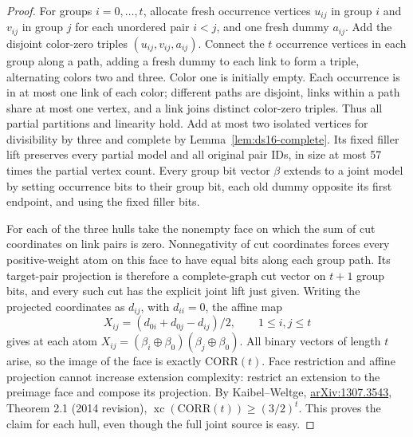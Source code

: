 \documentclass[11pt]{article}
\begin{document}
\begin{proof}
For groups $i=0,\ldots,t$, allocate fresh occurrence vertices $u_{ij}$ in group $i$ and $v_{ij}$ in group $j$ for each unordered pair $i<j$, and one fresh dummy $a_{ij}$. Add the disjoint color-zero triples $(u_{ij},v_{ij},a_{ij})$. Connect the $t$ occurrence vertices in each group along a path, adding a fresh dummy to each link to form a triple, alternating colors two and three. Color one is initially empty. Each occurrence is in at most one link of each color; different paths are disjoint, links within a path share at most one vertex, and a link joins distinct color-zero triples. Thus all partial partitions and linearity hold. Add at most two isolated vertices for divisibility by three and complete by Lemma~\ref{lem:ds16-complete}. Its fixed filler lift preserves every partial model and all original pair IDs, in size at most 57 times the partial vertex count. Every group bit vector $\beta$ extends to a joint model by setting occurrence bits to their group bit, each old dummy opposite its first endpoint, and using the fixed filler bits.

For each of the three hulls take the nonempty face on which the sum of cut coordinates on link pairs is zero. Nonnegativity of cut coordinates forces every positive-weight atom on this face to have equal bits along each group path. Its target-pair projection is therefore a complete-graph cut vector on $t+1$ group bits, and every such cut has the explicit joint lift just given. Writing the projected coordinates as $d_{ij}$, with $d_{ii}=0$, the affine map
\[
X_{ij}=(d_{0i}+d_{0j}-d_{ij})/2,\qquad 1\le i,j\le t
\]
gives at each atom $X_{ij}=(\beta_i\oplus\beta_0)(\beta_j\oplus\beta_0)$. All binary vectors of length $t$ arise, so the image of the face is exactly $\mathrm{CORR}(t)$. Face restriction and affine projection cannot increase extension complexity: restrict an extension to the preimage face and compose its projection. By Kaibel--Weltge, \href{https://arxiv.org/abs/1307.3543}{arXiv:1307.3543}, Theorem 2.1 (2014 revision), $\operatorname{xc}(\mathrm{CORR}(t))\ge(3/2)^t$. This proves the claim for each hull, even though the full joint source is easy.
\end{proof}
\end{document}

